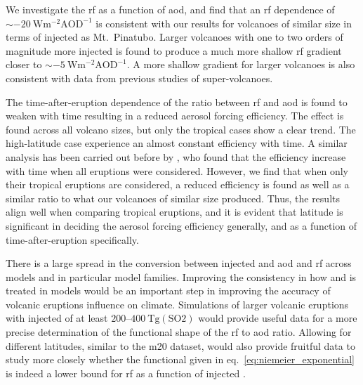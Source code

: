 \documentclass{ametsocV6.1}
\newcommand{\iso}[1][i]{{#1}njected \ce{SO2}}
\begin{document}
We investigate the \gls{rf} as a function of \gls{aod}, and find that an \gls{rf}
dependence of \(\sim\SI{-20}{\watt\metre^{-2}\mathrm{AOD}^{-1}}\) is consistent with our
results for volcanoes of similar size in terms of \iso{} as Mt.\ Pinatubo. Larger
volcanoes with one to two orders of magnitude more \iso{} is found to produce a much
more shallow \gls{rf} gradient closer to \(\sim
\SI{-5}{\watt\metre^{-2}\mathrm{AOD}^{-1}}\). A more shallow gradient for larger
volcanoes is also consistent with data from previous studies of super-volcanoes.

The time-after-eruption dependence of the ratio between \gls{rf} and \gls{aod} is found
to weaken with time resulting in a reduced aerosol forcing efficiency. The effect is
found across all volcano sizes, but only the tropical cases show a clear trend. The
high-latitude case experience an almost constant efficiency with time. A similar
analysis has been carried out before by \citet{marshall2020}, who found that the
efficiency increase with time when all eruptions were considered. However, we find that
when only their tropical eruptions are considered, a reduced efficiency is found as well
as a similar ratio to what our volcanoes of similar size produced. Thus, the results
align well when comparing tropical eruptions, and it is evident that latitude is
significant in deciding the aerosol forcing efficiency generally, and as a function of
time-after-eruption specifically.

There is a large spread in the conversion between \iso{} and \gls{aod} and \gls{rf}
across models and in particular model families. Improving the consistency in how
 and  is treated in models would be an important step in improving the
accuracy of volcanic eruptions influence on climate. Simulations of larger volcanic
eruptions with \iso{} of at least \(200\)--\(\SI{400}{\tera\gram(\mathrm{SO2})}\) would
provide useful data for a more precise determination of the functional shape of the
\gls{rf} to \gls{aod} ratio. Allowing for different latitudes, similar to the \gls{m20}
dataset, would also provide fruitful data to study more closely whether the functional
given in eq.~\ref{eq:niemeier_exponential} is indeed a lower bound for \gls{rf} as a
function of \iso{}.

\clearpage
\acknowledgments{}
\end{document}
